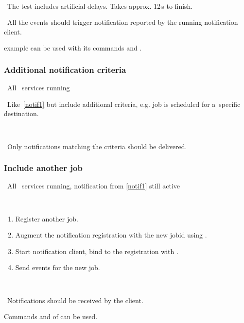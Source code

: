 \how\ 

\note\ The test includes artificial delays. Takes approx. 12\,s to finish.

\result\ All the events should trigger notification reported by the running
notification client.

\begin{hints}
 example can be used with its commands  and .
\end{hints}



\subsubsection{Additional notification criteria}
\label{notif-complex}
\req\ All \LB\ services running

\what\ Like~\ref{notif1} but include additional criteria,
e.g. job is scheduled for a~specific destination.

\how\ 

\result\ Only notifications matching the criteria should be delivered.




\subsubsection{Include another job}
\label{notif2}
\req\ All \LB\ services running, notification from \ref{notif1} still active

\how\
\begin{enumerate}
\item Register another job.
\item Augment the notification registration with the new jobid using
\code{edg\_wll\_NotifChange}.
\item Start notification client, bind to the registration with
.
\item Send events for the new job.
\end{enumerate}

\how\ 

\result\ Notifications should be received by the client.

\begin{hints}
Commands  and  of 
can be used.
\end{hints}

